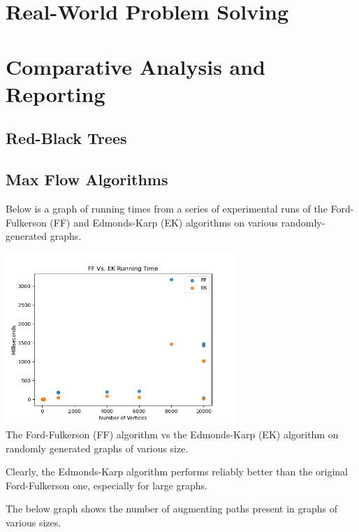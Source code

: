 \documentclass[12pt]{amsart}
\begin{document}
\section{Real-World Problem Solving}


\section{Comparative Analysis and Reporting}

\subsection{Red-Black Trees}


\subsection{Max Flow Algorithms}
    Below is a graph of running times from a series of
    experimental runs of the Ford-Fulkerson (FF) and
    Edmonds-Karp (EK) algorithms on various randomly-generated
    graphs.

\begin{center}
    \includegraphics[width=0.65\textwidth]
        {mf_algorithm_comparison} \\
    The Ford-Fulkerson (FF) algorithm vs the Edmonds-Karp (EK)
    algorithm on randomly generated graphs of various size. \\
    \vskip 1cm
\end{center}

    Clearly, the Edmonds-Karp algorithm performs reliably
    better than the original Ford-Fulkerson one, especially for
    large graphs.

    The below graph shows the number of augmenting paths present
    in graphs of various sizes.
\end{document}
